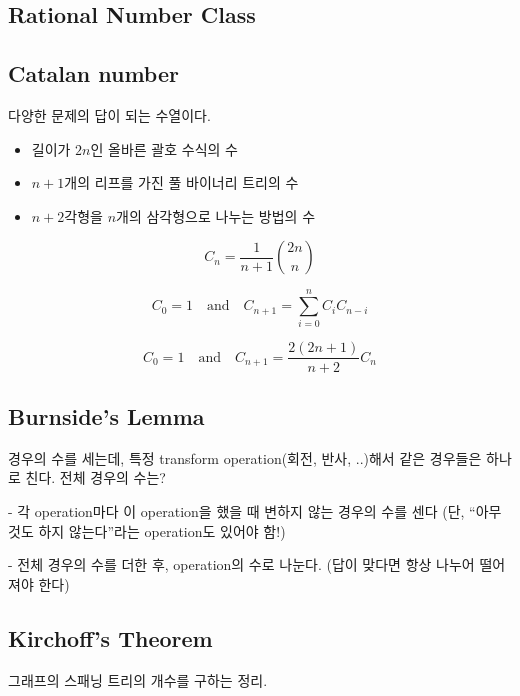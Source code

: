 \documentclass[10pt,landscape,a4paper,twocolumn]{article}
\begin{document}
\subsection{Rational Number Class}


\subsection{Catalan number}

다양한 문제의 답이 되는 수열이다.

\begin{itemize}
\item 길이가 $2n$인 올바른 괄호 수식의 수
\item $n+1$개의 리프를 가진 풀 바이너리 트리의 수
\item $n+2$각형을 $n$개의 삼각형으로 나누는 방법의 수
\end{itemize}

\begin{displaymath}
C_n = \frac{1}{n + 1} \binom{2n}{n}
\end{displaymath}

\begin{displaymath}
C_0 = 1 \quad  \textrm{and} \quad  C_{n + 1} = \sum_{i=0}^{n} C_i C_{n-i}
\end{displaymath}

\begin{displaymath}
C_0 = 1 \quad \textrm{and} \quad  C_{n + 1} = \frac{2(2n+1)}{n+2} C_n
\end{displaymath}

\subsection{Burnside's Lemma}

경우의 수를 세는데, 특정 transform operation(회전, 반사, ..)해서 같은 경우들은 하나로 친다.
전체 경우의 수는?

- 각 operation마다 이 operation을 했을 때 변하지 않는 경우의 수를 센다
(단, ``아무것도 하지 않는다''라는 operation도 있어야 함!)

- 전체 경우의 수를 더한 후, operation의 수로 나눈다. (답이 맞다면 항상 나누어 떨어져야 한다)

\subsection{Kirchoff's Theorem}

그래프의 스패닝 트리의 개수를 구하는 정리.
\end{document}
